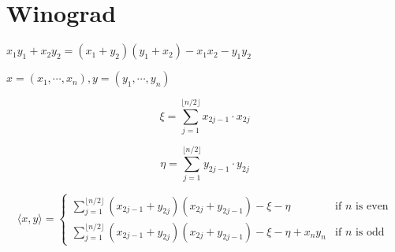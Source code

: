 \documentclass[border=10pt,varwidth]{standalone}
\begin{document}
\section{Winograd}

$
x_1 y_1 + x_2 y_2 = (x_1 +y_2)(y_1 + x_2)-x_1 x_2 - y_1 y_2
$

$
x = (x_1, \cdots, x_n), y=(y_1, \cdots, y_n)
$

\[
\xi = \sum_{j=1}^{ \lfloor n/2 \rfloor} x_{2j-1} \cdot x_{2j}
\]

\[
\eta = \sum_{j=1}^{ \lfloor n/2 \rfloor} y_{2j-1} \cdot y_{2j}
\]

\[
\langle x,y \rangle =
\begin{cases}
 \displaystyle  \sum_{j=1}^{ \lfloor n/2 \rfloor} (x_{2j-1} + y_{2j})(x_{2j}+y_{2j-1})-\xi - \eta & \text{if  $n$ is even}\\
\displaystyle  \sum_{j=1}^{ \lfloor n/2 \rfloor} (x_{2j-1} + y_{2j})(x_{2j}+y_{2j-1})-\xi - \eta + x_n y_n & \text{if  $n$ is odd}
\end{cases}
\]
\end{document}
